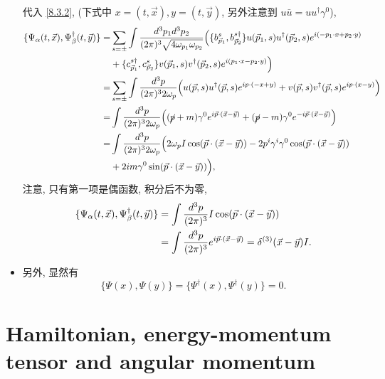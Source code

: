 \begin{itemize}
	\begin{tcolorbox}[title=calculation:]
		代入 \eqref{8.3.2}, (下式中 $x = (t, \vec{x}), y = (t, \vec{y})$, 另外注意到 $u \bar{u} = u u^\dag \gamma^0$),
		\begin{align}
			\{\Psi_\alpha(t, \vec{x}), \Psi^\dag_\beta(t, \vec{y})\} =& \sum_{s = \pm} \int \frac{d^3 p_1 d^3 p_2}{(2 \pi)^3 \sqrt{4 \omega_{p_1} \omega_{p_2}}} \Big( \{b^s_{\vec{p}_1}, b^{s \dag}_{\vec{p}_2}\} u(\vec{p}_1, s) u^\dag(\vec{p}_2, s) e^{i (- p_1 \cdot x + p_2 \cdot y)} \notag \\
			& + \{c^{s \dag}_{\vec{p}_1}, c^s_{\vec{p}_2}\} v(\vec{p}_1, s) v^\dag(\vec{p}_2, s) e^{i (p_1 \cdot x - p_2 \cdot y)} \Big) \notag \\
			=& \sum_{s = \pm} \int \frac{d^3 p}{(2 \pi)^3 2 \omega_p} \Big( u(\vec{p}, s) u^\dag(\vec{p}, s) e^{i p \cdot (- x + y)} + v(\vec{p}, s) v^\dag(\vec{p}, s) e^{i p \cdot (x - y)} \Big) \notag \\
			=& \int \frac{d^3 p}{(2 \pi)^3 2 \omega_p} \Big( (\cancel{p} + m) \gamma^0 e^{i \vec{p} \cdot (\vec{x} - \vec{y})} + (\cancel{p} - m) \gamma^0 e^{- i \vec{p} \cdot (\vec{x} - \vec{y})} \Big) \notag \\
			=& \int \frac{d^3 p}{(2 \pi)^3 2 \omega_p} \Big( 2 \omega_p I \cos(\vec{p} \cdot (\vec{x} - \vec{y})) - 2 p^i \gamma^i \gamma^0 \cos(\vec{p} \cdot (\vec{x} - \vec{y})) \notag \\
			& + 2 i m \gamma^0 \sin(\vec{p} \cdot (\vec{x} - \vec{y})) \Big),
		\end{align}
		注意, 只有第一项是偶函数, 积分后不为零,
		\begin{align}
			\{\Psi_\alpha(t, \vec{x}), \Psi^\dag_\beta(t, \vec{y})\} &= \int \frac{d^3 p}{(2 \pi)^3} I \cos(\vec{p} \cdot (\vec{x} - \vec{y})) \notag \\
			&= \int \frac{d^3 p}{(2 \pi)^3} e^{i \vec{p} \cdot (\vec{x} - \vec{y})} = \delta^{(3)}(\vec{x} - \vec{y}) I.
		\end{align}
	\end{tcolorbox}
	
	\item 另外, 显然有
	\begin{equation}
		\{\Psi(x), \Psi(y)\} = \{\Psi^\dag(x), \Psi^\dag(y)\} = 0.
	\end{equation}
\end{itemize}

\section{Hamiltonian, energy-momentum tensor and angular momentum}
